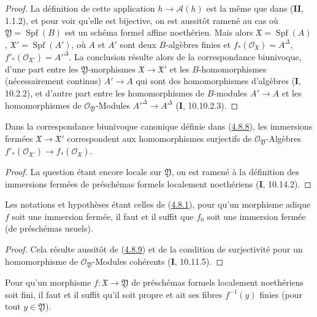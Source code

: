 \begin{proof}
La définition de cette application $h\to\mathcal A(h)$ est la même que dans
(\textbf{II}, 1.1.2), et pour voir qu'elle est bijective, on est aussitôt ramené au cas
où $\mathfrak Y=\operatorname{Spf}(B)$ est un schéma formel affine noethérien.
Mais alors $\mathfrak X=\operatorname{Spf}(A)$,
$\mathfrak X'=\operatorname{Spf}(A')$, où $A$ et $A'$ sont deux $B$-algèbres
finies et $f_*(\mathcal O_{\mathfrak X})=A^\Delta$,
$f'_*(\mathcal O_{\mathfrak X'})=A'^\Delta$. La conclusion résulte alors de
la correspondance biunivoque, d'une part entre les $\mathfrak Y$-morphismes
$\mathfrak X\to\mathfrak X'$ et les $B$-homomorphismes (nécessairement
continus) $A'\to A$ qui sont des homomorphismes d'algèbres (\textbf{I}, 10.2.2), et
d'autre part entre les homomorphismes de $B$-modules $A'\to A$ et les
homomorphismes de $\mathcal O_{\mathfrak Y}$-Modules
$A'^\Delta\to A^\Delta$ (\textbf{I}, 10.10.2.3).
\end{proof}

\begin{corollary}[4.8.9]
\label{III.4.8.9-fr}
Dans la correspondance biunivoque canonique définie dans
\textup{(\hyperref[III.4.8.8-fr]{4.8.8})}, les immersions fermées
$\mathfrak X\to\mathfrak X'$ correspondent aux homomorphismes surjectifs de
$\mathcal O_{\mathfrak Y}$-Algèbres
$f'_*(\mathcal O_{\mathfrak X'})\to f_*(\mathcal O_{\mathfrak X})$.
\end{corollary}

\begin{proof}
La question étant encore locale sur $\mathfrak Y$, on est ramené à la
définition des immersions fermées de préschémas formels localement noethériens
(\textbf{I}, 10.14.2).
\end{proof}

\begin{corollary}[4.8.10]
\label{III.4.8.10-fr}
Les notations et hypothèses étant celles de
\textup{(\hyperref[III.4.8.1-fr]{4.8.1})}, pour qu'un morphisme adique $f$ soit une
immersion fermée, il faut et il suffit que $f_0$ soit une immersion fermée (de
préschémas usuels).
\end{corollary}

\begin{proof}
Cela résulte aussitôt de (\hyperref[III.4.8.9-fr]{4.8.9}) et de la condition de
surjectivité pour un homomorphisme de $\mathcal O_{\mathfrak Y}$-Modules
cohérents (\textbf{I}, 10.11.5).
\end{proof}

\begin{proposition}[4.8.11]
\label{III.4.8.11-fr}
Pour qu'un morphisme $f:\mathfrak X\to\mathfrak Y$ de préschémas formels localement
noethériens soit fini, il faut et il suffit qu'il soit propre et ait ses fibres
$f^{-1}(y)$ finies (pour tout $y\in\mathfrak Y$).
\end{proposition}

